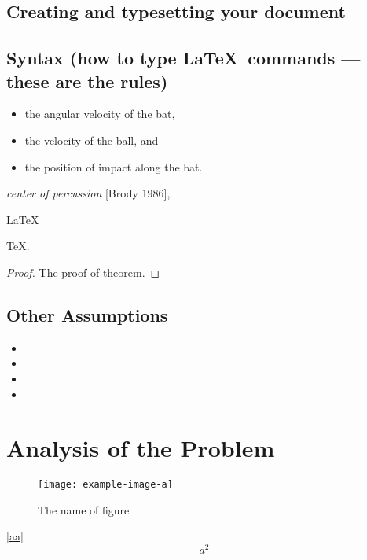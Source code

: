 \documentclass{mcmthesis}
\begin{document}
\subsection{Creating and typesetting your document}

\subsection{Syntax (how to type \LaTeX\ commands --- these
	are the rules)}

\lipsum[3]
\begin{itemize}
	\item the angular velocity of the bat,
	\item the velocity of the ball, and
	\item the position of impact along the bat.
\end{itemize}
\lipsum[4]
\emph{center of percussion} [Brody 1986], \lipsum[5]

\begin{Theorem} \label{thm:latex}
	\LaTeX
\end{Theorem}
\begin{Lemma} \label{thm:tex}
	\TeX .
\end{Lemma}
\begin{proof}
	The proof of theorem.
\end{proof}

\subsection{Other Assumptions}
\lipsum[6]
\begin{itemize}
	\item
	\item
	\item
	\item
\end{itemize}

\lipsum[7]

\section{Analysis of the Problem}
\begin{figure}[h]
	\small
	\centering
	\texttt{[image: example-image-a]}
	\caption{The name of figure} \label{fig:aa}
\end{figure}

\lipsum[8] \eqref{aa}
\begin{equation}
	a^2 \label{aa}
\end{equation}
\end{document}

